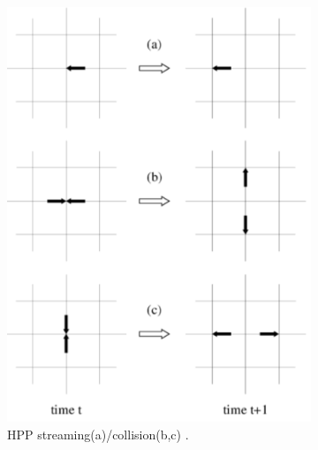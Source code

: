 \begin{figure}[H]
  \centering
  \begin{subfigure}[h]{0.5\textwidth}
    \includegraphics[width=\textwidth]{img/fig4.png}
    \caption{HPP streaming(a)/collision(b,c) \cite{chopard}.}
  \end{subfigure}
  \begin{subfigure}[h]{0.3\textwidth}

\end{subfigure}
\end{figure}
